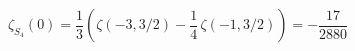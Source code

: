 \begin{equation}
\zeta_{S_4}(0)=\frac{1}{3}\left(\zeta(-3,3/2)
-\frac{1}{4}\,\zeta(-1,3/2)\right)
=-\frac{17}{2880}
\end{equation}

